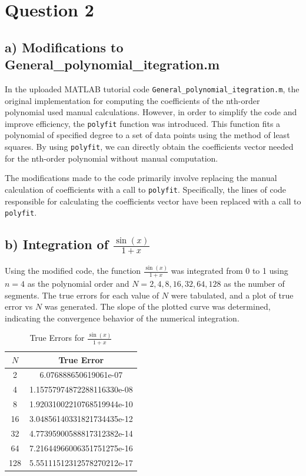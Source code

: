 
\section*{Question 2}

\subsection*{a) Modifications to General\_polynomial\_itegration.m}

In the uploaded MATLAB tutorial code \texttt{General\_polynomial\_itegration.m}, the original implementation for computing the coefficients of the nth-order polynomial used manual calculations. However, in order to simplify the code and improve efficiency, the \texttt{polyfit} function was introduced. This function fits a polynomial of specified degree to a set of data points using the method of least squares. By using \texttt{polyfit}, we can directly obtain the coefficients vector needed for the nth-order polynomial without manual computation.

The modifications made to the code primarily involve replacing the manual calculation of coefficients with a call to \texttt{polyfit}. Specifically, the lines of code responsible for calculating the coefficients vector have been replaced with a call to \texttt{polyfit}. 

\subsection*{b) Integration of $\frac{\sin(x)}{1+x}$}

Using the modified code, the function $\frac{\sin(x)}{1+x}$ was integrated from 0 to 1 using $n=4$ as the polynomial order and $N=2, 4, 8, 16, 32, 64, 128$ as the number of segments. The true errors for each value of $N$ were tabulated, and a plot of true error vs $N$ was generated. The slope of the plotted curve was determined, indicating the convergence behavior of the numerical integration.

\begin{table}[h]
    \centering
    \begin{tabular}{|c|c|}
    \hline
    $N$ & True Error \\
    \hline
    2 & 6.076888650619061e-07 \\
    4 & 1.15757974872288116330e-08 \\
    8 & 1.92031002210768519944e-10 \\
    16 & 3.04856140331821734435e-12 \\
    32 & 4.77395900588817312382e-14 \\
    64 & 7.21644966006351751275e-16 \\
    128 & 5.55111512312578270212e-17 \\
    \hline
    \end{tabular}
    \caption{True Errors for $\frac{\sin(x)}{1+x}$}
    \label{tab:sinx1plusx}
\end{table}

